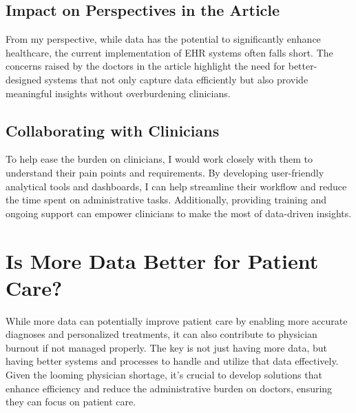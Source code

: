 \documentclass{article}
\begin{document}
\subsection*{Impact on Perspectives in the Article}

From my perspective, while data has the potential to significantly enhance healthcare, the current implementation of EHR systems often falls short. The concerns raised by the doctors in the article highlight the need for better-designed systems that not only capture data efficiently but also provide meaningful insights without overburdening clinicians.

\subsection*{Collaborating with Clinicians}

To help ease the burden on clinicians, I would work closely with them to understand their pain points and requirements. By developing user-friendly analytical tools and dashboards, I can help streamline their workflow and reduce the time spent on administrative tasks. Additionally, providing training and ongoing support can empower clinicians to make the most of data-driven insights.

\section*{Is More Data Better for Patient Care?}

While more data can potentially improve patient care by enabling more accurate diagnoses and personalized treatments, it can also contribute to physician burnout if not managed properly. The key is not just having more data, but having better systems and processes to handle and utilize that data effectively. Given the looming physician shortage, it's crucial to develop solutions that enhance efficiency and reduce the administrative burden on doctors, ensuring they can focus on patient care.
\end{document}
